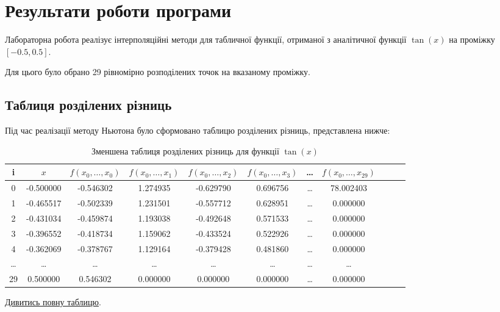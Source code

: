 \documentclass[a4paper, 12pt]{article}
\begin{document}
\newpage
\section{Результати роботи програми}

Лабораторна робота реалізує інтерполяційні методи для табличної функції, отриманої з аналітичної функції \( \tan(x) \) на проміжку \([-0.5, 0.5]\).

Для цього було обрано 29 рівномірно розподілених точок на вказаному проміжку. 

\subsection{Таблиця розділених різниць}

Під час реалізації методу Ньютона було сформовано таблицю розділених різниць, представлена нижче:

\hspace*{-2cm}
\begin{table}[ht]
    \begin{tabular}{|c|c|c|c|c|c|c|c|c|c|c|}
        \hline
        \textbf{i} & \( x \) & \( f(x_0, \ldots, x_0) \) & \( f(x_0, \ldots, x_1) \) & \( f(x_0, \ldots, x_2) \) & \( f(x_0, \ldots, x_3) \) & \ldots & \( f(x_0, \ldots, x_{29}) \) \\
        \hline
        0 & -0.500000 & -0.546302 & 1.274935 & -0.629790 & 0.696756 & \ldots & 78.002403 \\
        1 & -0.465517 & -0.502339 & 1.231501 & -0.557712 & 0.628951 & \ldots & 0.000000 \\
        2 & -0.431034 & -0.459874 & 1.193038 & -0.492648 & 0.571533 & \ldots & 0.000000 \\
        3 & -0.396552 & -0.418734 & 1.159062 & -0.433524 & 0.522926 & \ldots & 0.000000 \\
        4 & -0.362069 & -0.378767 & 1.129164 & -0.379428 & 0.481860 & \ldots & 0.000000 \\
        \hline
		\ldots & \ldots & \ldots & \ldots & \ldots & \ldots & \ldots & \ldots \\
        \hline
        29 & 0.500000 & 0.546302 & 0.000000 & 0.000000 & 0.000000 & \ldots & 0.000000 \\
        \hline
    \end{tabular}
    \caption{Зменшена таблиця розділених різниць для функції \( \tan(x) \)}
\end{table}

\hyperref[sec:table1]{Дивитись повну таблицю}.
\end{document}
